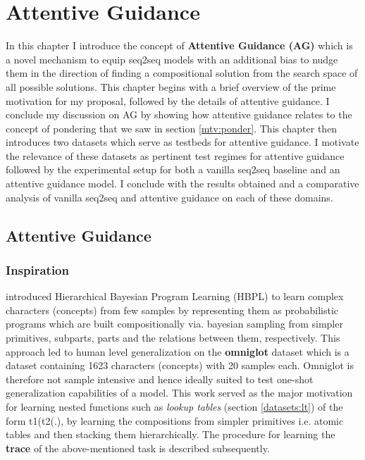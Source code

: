 \chapter{Attentive Guidance}\label{Chapter:proposals}

In this chapter I introduce the concept of \textbf{Attentive Guidance (AG)} which is a novel mechanism to equip seq2seq models with an additional bias to nudge them in the direction of finding a compositional solution from the search space of all possible solutions. This chapter begins with a brief overview of the prime motivation for my proposal, followed by the details of attentive guidance. I conclude my discussion on AG by showing how attentive guidance relates to the concept of pondering that we saw in section \ref{mtv:ponder}. This chapter then introduces two datasets which serve as testbeds for attentive guidance. I motivate the relevance of these datasets as pertinent test regimes for attentive guidance followed by the experimental setup for both a vanilla seq2seq baseline and an attentive guidance model. I conclude with the results obtained and a comparative analysis of vanilla seq2seq and attentive guidance on each of these domains.


\section{Attentive Guidance}

\subsection{Inspiration} 

\cite{Lake2015} introduced Hierarchical Bayesian Program Learning (HBPL) to learn complex characters (concepts) from few samples by representing them as probabilistic programs which are built compositionally via. bayesian sampling from simpler primitives, subparts, parts and the relations between them, respectively. This approach led to human level generalization on the \textbf{omniglot} dataset \citep{Lake2015} which is a dataset containing 1623 characters (concepts) with 20 samples each. Omniglot is therefore not sample intensive and hence ideally suited to test one-shot generalization capabilities of a model. This work served as the major motivation for learning nested functions such as \textit{lookup tables} (section \ref{datasets:lt}) of the form t1(t2(.), by learning the compositions from simpler primitives i.e. atomic tables and then stacking them hierarchically. The procedure for learning the \textbf{trace} of the above-mentioned task is described subsequently.

